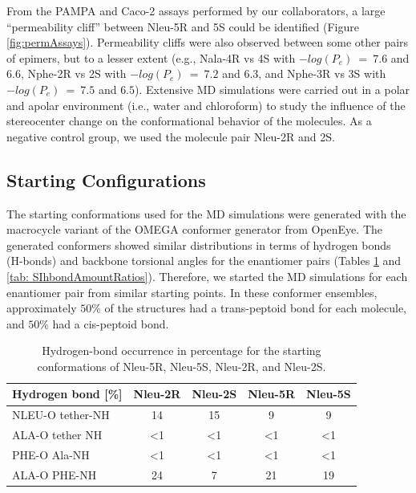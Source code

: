 From the PAMPA and Caco-2 assays performed by our collaborators, a large ``permeability cliff''  between Nleu-5R and 5S could be identified (Figure \ref{fig:permAssays}). Permeability cliffs were also observed between some other pairs of epimers, but to a lesser extent (e.g., Nala-4R vs 4S with $−log(P_e)$~=~$7.6$ and $6.6$, Nphe-2R vs 2S with $−log(P_e)$~=~$7.2$ and $6.3$, and Nphe-3R vs 3S with $−log(P_e)$~=~$7.5$ and $6.5$). 
Extensive MD simulations were carried out in a polar and apolar environment (i.e., water and chloroform) to study the influence of the stereocenter change on the conformational behavior of the molecules. As a negative control group, we used the molecule pair Nleu-2R and 2S. 

\FloatBarrier

\subsection{Starting Configurations} 
The starting conformations used for the MD simulations were generated with the macrocycle variant of the OMEGA conformer generator from OpenEye.  \cite{Hawkins2012, Hawkins2010, Poongavanam2018}
The generated conformers showed similar distributions in terms of hydrogen bonds (H-bonds) and backbone torsional angles for the enantiomer pairs (Tables \ref{tab: SIhbondRatios} and \ref{tab: SIhbondAmountRatios}).
Therefore, we started the MD simulations for each enantiomer pair from similar starting points.
In these conformer ensembles, approximately $50\%$ of the structures had a trans-peptoid bond for each molecule, and $50\%$ had a cis-peptoid bond.

\begin{table}[h!]
\centering
\caption{Hydrogen-bond occurrence in percentage for the starting conformations of Nleu-5R, Nleu-5S, Nleu-2R, and Nleu-2S.}
\label{tab: SIhbondRatios}
  \begin{adjustbox}{max width=\textwidth}
  \begin{tabular}{lcccc}
Hydrogen bond {[}\%{]} & Nleu-2R      & Nleu-2S      & Nleu-5R      & Nleu-5S      \\
\hline
NLEU-O tether-NH       & 14         & 15         &  9           & 9        \\
ALA-O tether NH        & \textless{}1 & \textless{}1  & \textless{}1  & \textless{}1 \\
PHE-O Ala-NH           & \textless{}1 & \textless{}1 & \textless{}1  & \textless{}1 \\
ALA-O PHE-NH           & 24           & 7            & 21 & 19 \\
    \hline
\end{tabular}%
\end{adjustbox}
\end{table}


